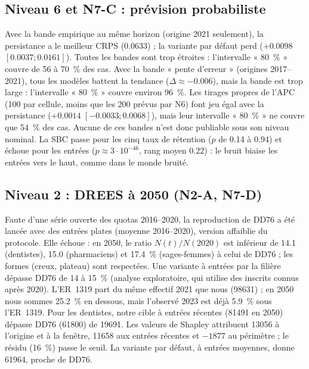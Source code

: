 \documentclass[11pt]{article}
\begin{document}
\subsection{Niveau 6 et N7-C : prévision probabiliste}
Avec la bande empirique au même horizon (origine 2021 seulement), la persistance a le meilleur CRPS
(\num{0.0633}\mesure{}) ; la variante par défaut perd ($+\num{0.0098}$ $[\num{0.0037} ; \num{0.0161}]$).
Toutes les bandes sont trop étroites : l'intervalle « 80~\% » couvre de 56 à 70\mesure{}~\% des cas.
Avec la bande « pente d'erreur » (origines 2017--2021), tous les modèles battent la tendance
($\Delta \approx -\num{0.006}$\mesure{}), mais la bande est trop large : l'intervalle « 80~\% »
couvre environ 96\mesure{}~\%. Les tirages propres de l'APC (100 par cellule, moins que les 200
prévus par N6) font jeu égal avec la persistance ($+\num{0.0014}$ $[\num{-0.0033} ; \num{0.0068}]$),
mais leur intervalle « 80~\% » ne couvre que 54\mesure{}~\% des cas. Aucune de ces bandes n'est donc publiable sous son niveau nominal. La SBC passe
pour les cinq taux de rétention ($p$ de \num{0.14} à \num{0.94}\mesure{}) et échoue pour les entrées
($p \approx 3 \cdot 10^{-46}$\mesure{}, rang moyen \num{0.22}) : le bruit biaise les entrées vers le
haut, comme dans le monde bruité.

\subsection{Niveau 2 : DREES à 2050 (N2-A, N7-D)}
Faute d'une série ouverte des quotas 2016--2020, la reproduction de DD76 a été lancée avec des
entrées plates (moyenne 2016--2020), version affaiblie du protocole. Elle échoue : en 2050, le ratio
$N(t)/N(2020)$ est inférieur de \num{14.1} (dentistes), \num{15.0} (pharmaciens) et \num{17.4}\mesure{}~\%
(sages-femmes) à celui de DD76 ; les formes (creux, plateau) sont respectées. Une variante à entrées
par la filière dépasse DD76 de 14 à 15\mesure{}~\% (analyse exploratoire, qui utilise des inscrits
connus après 2020). L'ER~1319 part du même effectif 2021 que nous (\num{98631}\mesure{}) ; en 2050 nous
sommes \num{25.2}\mesure{}~\% en dessous, mais l'observé 2023 est déjà \num{5.9}\mesure{}~\% sous
l'ER~1319. Pour les dentistes, notre cible à entrées récentes (\num{81491}\mesure{} en 2050) dépasse
DD76 (\num{61800}) de \num{19691}. Les valeurs de Shapley attribuent \num{13056}\mesure{} à l'origine et
à la fenêtre, \num{11658}\mesure{} aux entrées récentes et $-\num{1877}$\mesure{} au périmètre ; le résidu
(16\derive{}~\%) passe le seuil. La variante par défaut, à entrées moyennes, donne
\num{61964}\mesure{}, proche de DD76.
\end{document}
